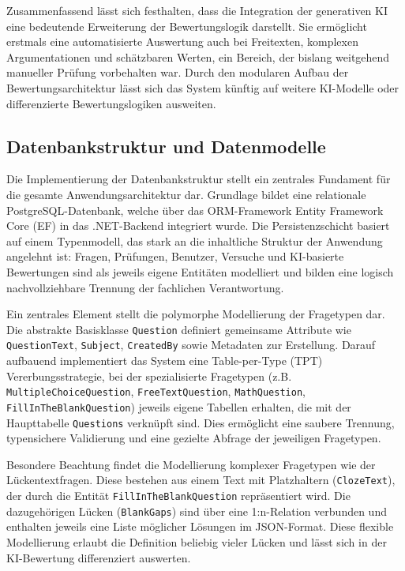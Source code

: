 \documentclass[a4paper,12pt]{article}
\begin{document}
Zusammenfassend lässt sich festhalten, dass die Integration der generativen KI eine bedeutende Erweiterung der Bewertungslogik darstellt. Sie ermöglicht erstmals eine automatisierte Auswertung auch bei Freitexten, komplexen Argumentationen und schätzbaren Werten, ein Bereich, der bislang weitgehend manueller Prüfung vorbehalten war. Durch den modularen Aufbau der Bewertungsarchitektur lässt sich das System künftig auf weitere KI-Modelle oder differenzierte Bewertungslogiken ausweiten.

\subsection{Datenbankstruktur und Datenmodelle}
Die Implementierung der Datenbankstruktur stellt ein zentrales Fundament für die gesamte Anwendungsarchitektur dar. Grundlage bildet eine relationale PostgreSQL-Datenbank, welche über das ORM-Framework Entity Framework Core (\acs{EF}) in das .NET-Backend integriert wurde. Die Persistenzschicht basiert auf einem Typenmodell, das stark an die inhaltliche Struktur der Anwendung angelehnt ist: Fragen, Prüfungen, Benutzer, Versuche und KI-basierte Bewertungen sind als jeweils eigene Entitäten modelliert und bilden eine logisch nachvollziehbare Trennung der fachlichen Verantwortung.

Ein zentrales Element stellt die polymorphe Modellierung der Fragetypen dar. Die abstrakte Basisklasse \texttt{Question} definiert gemeinsame Attribute wie \texttt{QuestionText}, \texttt{Subject}, \texttt{CreatedBy} sowie Metadaten zur Erstellung. Darauf aufbauend implementiert das System eine Table-per-Type (TPT) Vererbungsstrategie, bei der spezialisierte Fragetypen (z.B. \texttt{MultipleChoiceQuestion}, \texttt{FreeTextQuestion}, \texttt{MathQuestion}, \texttt{FillInTheBlankQuestion}) jeweils eigene Tabellen erhalten, die mit der Haupttabelle \texttt{Questions} verknüpft sind. Dies ermöglicht eine saubere Trennung, typensichere Validierung und eine gezielte Abfrage der jeweiligen Fragetypen.

Besondere Beachtung findet die Modellierung komplexer Fragetypen wie der Lückentextfragen. Diese bestehen aus einem Text mit Platzhaltern (\texttt{ClozeText}), der durch die Entität \texttt{FillInTheBlankQuestion} repräsentiert wird. Die dazugehörigen Lücken (\texttt{BlankGaps}) sind über eine 1:n-Relation verbunden und enthalten jeweils eine Liste möglicher Lösungen im JSON-Format. Diese flexible Modellierung erlaubt die Definition beliebig vieler Lücken und lässt sich in der KI-Bewertung differenziert auswerten.
\end{document}
